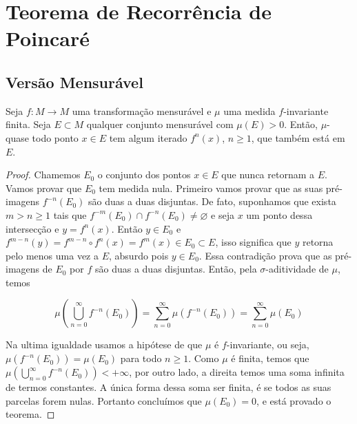 

\chapter{Teorema de Recorrência de Poincaré}

\section{Versão Mensurável}

\begin{teorema}\label{trp_vm}
Seja $f:M\to M$ uma transformação mensurável e $\mu$ uma medida $f$-invariante finita. Seja $E\subset M$ qualquer conjunto mensurável com $\mu(E)>0$. Então, $\mu$-quase todo ponto $x\in E$ tem algum iterado $f^n(x)$, $n\geq 1$, que também está em $E$.
\end{teorema}

\begin{proof}
Chamemos $E_0$ o conjunto dos pontos $x\in E$ que nunca retornam a $E$. Vamos provar que $E_0$ tem medida nula. Primeiro vamos provar que as suas pré-imagens $f^{-n}(E_0)$ são duas a duas disjuntas. De fato, suponhamos que exista $m>n\geq 1$ tais que $f^{-m}(E_0)\cap f^{-n}(E_0)\neq\varnothing$ e seja $x$ um ponto dessa intersecção e $y=f^{n}(x)$. Então $y\in E_0$ e $f^{m-n}(y)=f^{m-n}\circ f^n(x)=f^{m}(x)\in E_0\subset E$, isso significa que $y$ retorna pelo menos uma vez a $E$, absurdo pois $y\in E_0$. Essa contradição prova que as pré-imagens de $E_0$ por $f$ são duas a duas disjuntas. Então, pela $\sigma$-aditividade de $\mu$, temos

\begin{equation*}
\mu\left(\bigcup_{n=0}^{\infty}f^{-n}(E_0)\right)=\sum_{n=0}^{\infty}\mu(f^{-n}(E_0))=\sum_{n=0}^{\infty}\mu(E_0)
\end{equation*}\vspace{0.1cm}

Na ultima igualdade usamos a hipótese de que $\mu$ é $f$-invariante, ou seja, $\mu(f^{-n}(E_0))=\mu(E_0)$  para todo $n\geq1$. Como $\mu$ é finita, temos que $\mu\left(\bigcup_{n=0}^{\infty}f^{-n}(E_0)\right)<+\infty$, por outro lado, a direita temos uma soma infinita de termos constantes. A única forma dessa soma ser finita, é se todos as suas parcelas forem nulas. Portanto concluímos que $\mu(E_0)=0$, e está provado o teorema. 
\end{proof}

%
%

